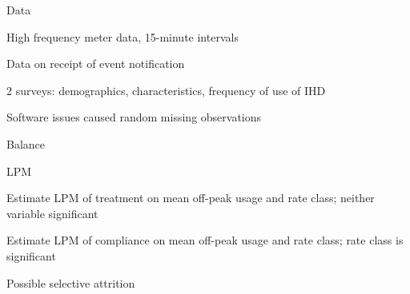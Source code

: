 \documentclass[aspectratio=169]{beamer}
\newenvironment{wideitemize}{\itemize\addtolength{\itemsep}{10pt}}{\enditemize}
\begin{document}
\begin{frame}{Data}
    \begin{wideitemize}
        \item High frequency meter data, 15-minute intervals
        \item Data on receipt of event notification
        \item 2 surveys: demographics, characteristics, frequency of use of IHD
        \item Software issues caused random missing observations
    \end{wideitemize}
\end{frame}

\begin{frame}{Balance}
    \center
\end{frame}

\begin{frame}{LPM}
    \begin{wideitemize}
        \item Estimate LPM of treatment on mean off-peak usage and rate class; neither variable significant
        \item Estimate LPM of compliance on mean off-peak usage and rate class; rate class is significant
        \item Possible selective attrition
    \end{wideitemize}
\end{frame}
\end{document}
